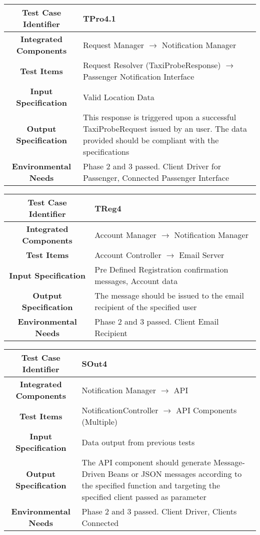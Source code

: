 \documentclass[11pt, a4paper,titlepage]{article}
\begin{document}
			\begin{tabularx}{\textwidth}{| c|X|}
				\hline \textbf{Test Case Identifier} & TPro4.1 \\
				\hline \textbf{Integrated Components} &  Request Manager $\rightarrow $ Notification Manager \\
				\hline \textbf{Test Items} & Request Resolver (TaxiProbeResponse) $\rightarrow $ Passenger Notification Interface \\
				\hline \textbf{Input Specification} & Valid Location Data \\
				\hline \textbf{Output Specification} & This response is triggered upon a successful TaxiProbeRequest issued by an user. \newline
				The data provided should be compliant with the specifications \\
				\hline \textbf{Environmental Needs} & Phase 2 and 3 passed. Client Driver for Passenger, Connected Passenger Interface \\
				\hline
			\end{tabularx}
			\newline
			
			\begin{tabularx}{\textwidth}{| c|X|}
				\hline \textbf{Test Case Identifier} & TReg4 \\
				\hline \textbf{Integrated Components} & Account Manager $\rightarrow $ Notification Manager \\
				\hline \textbf{Test Items} & Account Controller $\rightarrow $ Email Server \\
				\hline \textbf{Input Specification} & Pre Defined Registration confirmation messages, Account data \\
				\hline \textbf{Output Specification} & The message should be issued to the email recipient of the specified user \\
				\hline \textbf{Environmental Needs} & Phase 2 and 3 passed. Client Email Recipient \\
				\hline
			\end{tabularx}
			\newline
			
			\begin{tabularx}{\textwidth}{| c|X|}
				\hline \textbf{Test Case Identifier} & SOut4 \\
				\hline \textbf{Integrated Components} & Notification Manager $\rightarrow $ API \\
				\hline \textbf{Test Items} & NotificationController $\rightarrow $ API Components (Multiple) \\
				\hline \textbf{Input Specification} & Data output from previous tests \\
				\hline \textbf{Output Specification} & The API component should generate Message-Driven Beans or JSON messages according to the specified function and targeting the specified client passed as parameter \\
				\hline \textbf{Environmental Needs} & Phase 2 and 3 passed. Client Driver, Clients Connected \\
				\hline
			\end{tabularx}
			\newline
			
\end{document}

